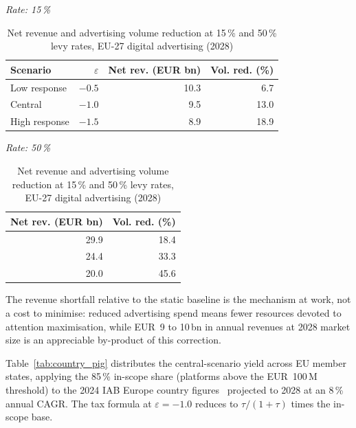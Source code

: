 \documentclass[../../main]{subfiles}
\begin{document}
\begin{table}[htbp]
\caption{Net revenue and advertising volume reduction at 15\,\% and 50\,\% levy rates, EU-27 digital advertising (2028)}\label{tab:revenue_pig}
\centering\small
\begin{minipage}[t]{.60\linewidth}
\centering
\textit{Rate: 15\,\%}\\[3pt]
\begin{tabular}{@{}l r r r@{}}
\toprule
Scenario & $\varepsilon$ & Net rev. (EUR bn) & Vol. red. (\%) \\
\midrule
Low response  & $-0.5$ & 10.3 &  6.7 \\
Central       & $-1.0$ &  9.5 & 13.0 \\
High response & $-1.5$ &  8.9 & 18.9 \\
\bottomrule
\end{tabular}
\end{minipage}\hfill
\begin{minipage}[t]{.34\linewidth}
\centering
\textit{Rate: 50\,\%}\\[3pt]
\begin{tabular}{@{}r r@{}}
\toprule
Net rev. (EUR bn) & Vol. red. (\%) \\
\midrule
29.9 & 18.4 \\
24.4 & 33.3 \\
20.0 & 45.6 \\
\bottomrule
\end{tabular}
\end{minipage}
\end{table}

The revenue shortfall relative to the static baseline is the mechanism at work, not a cost to minimise: reduced advertising spend means fewer resources devoted to attention maximisation, while EUR~9 to 10\,bn in annual revenues at 2028 market size is an appreciable by-product of this correction.

Table~\ref{tab:country_pig} distributes the central-scenario yield across EU member states, applying the 85\,\% in-scope share (platforms above the EUR~100\,M threshold) to the 2024 IAB Europe country figures~\citep{iab_adex_2024} projected to 2028 at an 8\,\% annual CAGR.
The tax formula at $\varepsilon = -1.0$ reduces to $\tau/(1+\tau)$ times the in-scope base.
\end{document}
